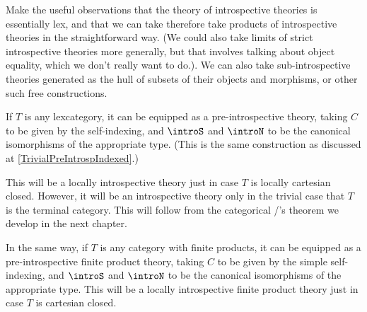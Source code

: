 \begin{TODOblock}
Make the useful observations that the theory of introspective theories is essentially lex, and that we can take therefore take products of introspective theories in the straightforward way. (We could also take limits of strict introspective theories more generally, but that involves talking about object equality, which we don't really want to do.). We can also take sub-introspective theories generated as the hull of subsets of their objects and morphisms, or other such free constructions.
\end{TODOblock}

\begin{construction}\label{TrivialPreIntrosp}
If $T$ is any lexcategory, it can be equipped as a pre-introspective theory, taking $C$ to be given by the self-indexing, and $\introS$ and $\introN$ to be the canonical isomorphisms of the appropriate type. (This is the same construction as discussed at \cref{TrivialPreIntrospIndexed}.)

This will be a locally introspective theory just in case $T$ is locally cartesian closed. However, it will be an introspective theory only in the trivial case that $T$ is the terminal category. This will follow from the categorical \Loeb/'s theorem we develop in the next chapter.

In the same way, if $T$ is any category with finite products, it can be equipped as a pre-introspective finite product theory, taking $C$ to be given by the simple self-indexing, and $\introS$ and $\introN$ to be the canonical isomorphisms of the appropriate type. This will be a locally introspective finite product theory just in case $T$ is cartesian closed.

\end{construction}


